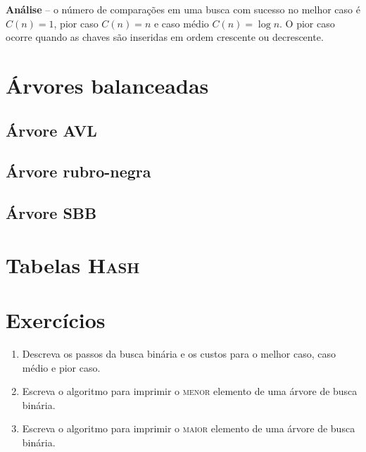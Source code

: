 {\bf Análise} -- o número de comparações em uma busca com sucesso no melhor caso é 
$C(n)= 1$, pior caso $C(n) = n$ e caso médio $C(n) = \log  n$.
O pior caso ocorre quando as chaves são inseridas em ordem crescente ou decrescente.

\section{Árvores balanceadas}


\subsection{Árvore AVL}

\subsection{Árvore rubro-negra}


\subsection{Árvore SBB}


\section{Tabelas \textsc{Hash}}


\section{Exercícios}

\begin{enumerate}
\item Descreva os passos da busca binária e os custos para o melhor caso, caso médio
e pior caso.

\item Escreva o algoritmo para imprimir o \textsc{menor} elemento de uma árvore de busca binária.
\item Escreva o algoritmo para imprimir o \textsc{maior} elemento de uma árvore de busca binária.
\end{enumerate}
